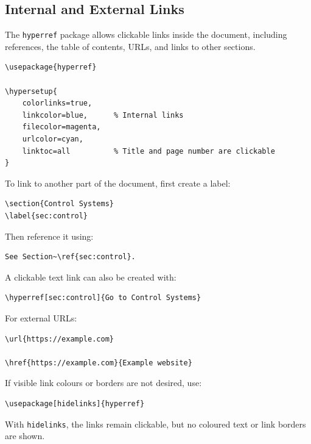 \subsection{Internal and External Links}

The \texttt{hyperref} package allows clickable links inside the document,
including references, the table of contents, URLs, and links to other
sections.

\begin{lstlisting}[style=latex]
\usepackage{hyperref}

\hypersetup{
    colorlinks=true,
    linkcolor=blue,      % Internal links
    filecolor=magenta,
    urlcolor=cyan,
    linktoc=all          % Title and page number are clickable
}
\end{lstlisting}

To link to another part of the document, first create a label:

\begin{lstlisting}[style=latex]
\section{Control Systems}
\label{sec:control}
\end{lstlisting}

Then reference it using:

\begin{lstlisting}[style=latex]
See Section~\ref{sec:control}.
\end{lstlisting}

A clickable text link can also be created with:

\begin{lstlisting}[style=latex]
\hyperref[sec:control]{Go to Control Systems}
\end{lstlisting}

For external URLs:

\begin{lstlisting}[style=latex]
\url{https://example.com}

\href{https://example.com}{Example website}
\end{lstlisting}

If visible link colours or borders are not desired, use:

\begin{lstlisting}[style=latex]
\usepackage[hidelinks]{hyperref}
\end{lstlisting}

With \texttt{hidelinks}, the links remain clickable, but no coloured
text or link borders are shown.